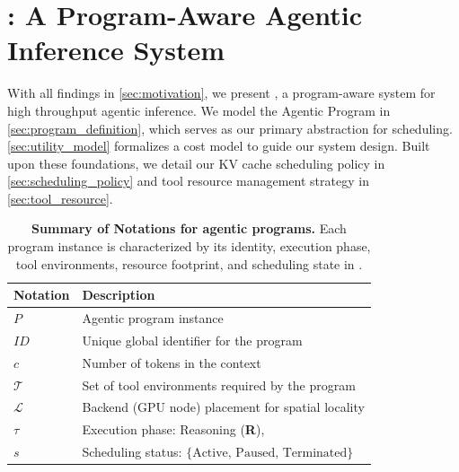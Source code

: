 \vspace{-2mm}
\section{\ouralg: A Program-Aware Agentic Inference System}
\label{sec:thunder_agent}

With all findings in \autoref{sec:motivation}, we present \ouralg, a program-aware system for high throughput agentic inference. We model the Agentic Program in \autoref{sec:program_definition}, which serves as our primary abstraction for scheduling. \autoref{sec:utility_model} formalizes a cost model to guide our system design. Built upon these foundations, we detail our KV cache scheduling policy in \autoref{sec:scheduling_policy} and tool resource management strategy in \autoref{sec:tool_resource}.

\begin{table}[ht]
\caption{\textbf{Summary of Notations for agentic programs.} Each program instance is characterized by its identity, execution phase, tool environments, resource footprint, and scheduling state in \ouralg.}
\vspace{-1.5em}
\label{tab:notations}
\begin{center}
\small
\renewcommand{\arraystretch}{1.1}
\begin{tabularx}{\columnwidth}{lX}
\toprule
\textbf{Notation} & \textbf{Description} \\
\midrule
$P$ & Agentic program instance \\
$\mathit{ID}$ & Unique global identifier for the program \\
$c$ & Number of tokens in the context \\
$\mathcal{T}$ & Set of tool environments required by the program \\
$\mathcal{L}$ & Backend (GPU node) placement for spatial locality \\
$\tau$ & Execution phase: Reasoning (\textbf{R}), \text{Acting (\textbf{A})} \\
$s$ & Scheduling status: $\{\text{Active, Paused, Terminated}\}$ \\
\bottomrule
\end{tabularx}
\end{center}
\vspace{-8mm}
\end{table}

